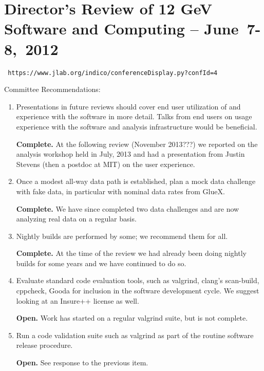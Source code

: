 \documentclass[12pt]{article}
\begin{document}
\section{Director's Review of 12 GeV Software and Computing -- June~7-8,~2012}

\begin{center}\tt
https://www.jlab.org/indico/conferenceDisplay.py?confId=4
\end{center}

Committee Recommendations:

\begin{enumerate}

\item Presentations in future reviews should cover end user
  utilization of and experience with the software in more
  detail. Talks from end users on usage experience with the software
  and analysis infrastructure would be beneficial.

  {\bf Complete.} At the following review (November 2013???) we
  reported on the analysis workshop held in July, 2013 and had a
  presentation from Justin Stevens (then a postdoc at MIT) on the user
  experience.

\item Once a modest all-way data path is established, plan a mock data
  challenge with fake data, in particular with nominal data rates from
  GlueX.

  {\bf Complete.} We have since completed two data challenges and are
  now analyzing real data on a regular basis.

\item Nightly builds are performed by some; we recommend them for all.

  {\bf Complete.} At the time of the review we had already been doing
  nightly builds for some years and we have continued to do so.

\item Evaluate standard code evaluation tools, such as valgrind,
  clang's scan-build, cppcheck, Gooda for inclusion in the software
  development cycle. We suggest looking at an Insure++ license as
  well.

  {\bf Open.} Work has started on a regular valgrind suite, but is not complete.

\item Run a code validation suite such as valgrind as part of the
  routine software release procedure.

  {\bf Open.} See response to the previous item.


\end{enumerate}
\end{document}
